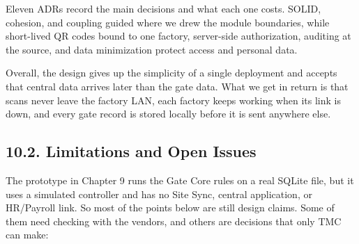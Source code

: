 Eleven ADRs record the main decisions and what each one costs. SOLID, cohesion, and coupling guided where we drew the module boundaries, while short-lived QR codes bound to one factory, server-side authorization, auditing at the source, and data minimization protect access and personal data.

Overall, the design gives up the simplicity of a single deployment and accepts that central data arrives later than the gate data. What we get in return is that scans never leave the factory LAN, each factory keeps working when its link is down, and every gate record is stored locally before it is sent anywhere else.

\subsection*{10.2. Limitations and Open Issues}

{}

The prototype in Chapter 9 runs the Gate Core rules on a real SQLite file, but it uses a simulated controller and has no Site Sync, central application, or HR/Payroll link. So most of the points below are still design claims. Some of them need checking with the vendors, and others are decisions that only TMC can make:

